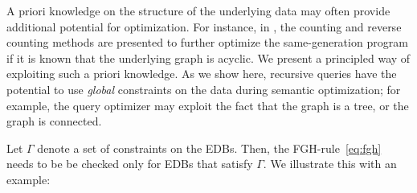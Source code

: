 A priori knowledge on the structure of the underlying data
may often provide additional potential for optimization. For instance,
in \cite{DBLP:conf/pods/BancilhonMSU86}, the counting and reverse counting
methods are presented to further optimize the same-generation program if
it is known that the underlying graph is acyclic.
We present a principled way of exploiting such a priori knowledge.
As we show here, recursive queries
have the potential to use {\em global} constraints on the data during
semantic optimization; for example, the query optimizer may exploit
the fact that the graph is a tree, or the graph is connected.

Let $\Gamma$ denote a set of constraints on the EDBs.  Then, the
FGH-rule~\eqref{eq:fgh} needs to be be checked only for EDBs that
satisfy $\Gamma$.  We illustrate this with an example:

